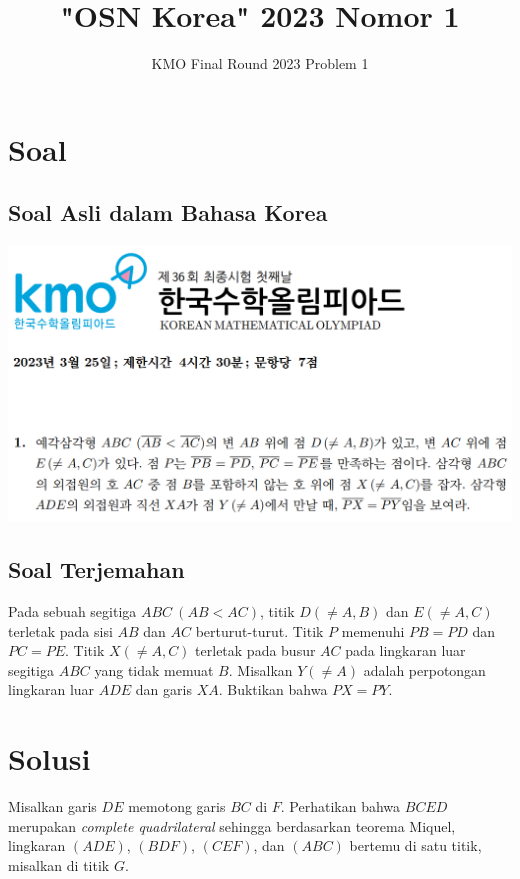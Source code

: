 \documentclass[12pt]{scrartcl}
\title{"OSN Korea" 2023 Nomor 1}
\author{KMO Final Round 2023 Problem 1}
\date{}
\begin{document}
\maketitle
\newpage

\section{Soal}
\subsection{Soal Asli dalam Bahasa Korea}
\begin{center}
    \includegraphics[scale=0.5]{KMO2023P1.png}
\end{center}
\subsection{Soal Terjemahan}
Pada sebuah segitiga $ABC ~(AB<AC)$, titik $D (\neq A, B)$ dan $E (\neq A, C)$ terletak pada sisi $AB$ dan $AC$ berturut-turut. Titik $P$ memenuhi $PB=PD$ dan $PC=PE$. Titik $X (\neq A, C)$ terletak pada busur $AC$ pada lingkaran luar segitiga $ABC$ yang tidak memuat $B$. Misalkan $Y (\neq A)$ adalah perpotongan lingkaran luar $ADE$ dan garis $XA$. Buktikan bahwa $PX=PY$.

\newpage
\section{Solusi}
    Misalkan garis $DE$ memotong garis $BC$ di $F$. Perhatikan bahwa $BCED$ merupakan \textit{complete quadrilateral} sehingga berdasarkan teorema Miquel, lingkaran $(ADE)$, $(BDF)$, $(CEF)$, dan $(ABC)$ bertemu di satu titik, misalkan di titik $G$. 
\end{document}
